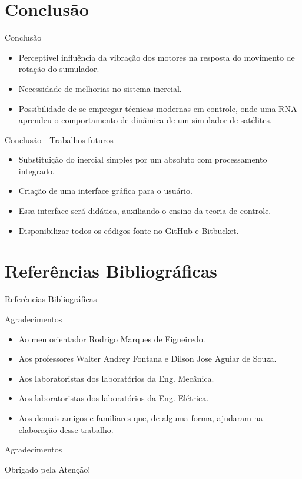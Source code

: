 \documentclass{beamer}
\begin{document}

\section{Conclusão}
	\begin{frame}{Conclusão}
    \begin{itemize}
        	\justifying
			\item Perceptível influência da vibração dos motores na resposta do movimento de rotação do sumulador.
			\item Necessidade de melhorias no sistema inercial.
			\item Possibilidade de se empregar técnicas modernas em controle, onde uma RNA aprendeu o comportamento de dinâmica de um simulador de satélites.
		\end{itemize}
\end{frame}


\begin{frame}{Conclusão - Trabalhos futuros}
    \begin{itemize}
        \justifying
		\item Substituição do inercial simples por um absoluto com processamento integrado. 
		\item Criação de uma interface gráfica para o usuário.
		\item Essa interface será didática, auxiliando o ensino da teoria de controle.  
		\item Disponibilizar todos os códigos fonte no GitHub e Bitbucket.
		\end{itemize}
\end{frame}


\section{Referências Bibliográficas}
\begin{frame}{Referências Bibliográficas}
	
\end{frame}
        

\begin{frame}{Agradecimentos}
	\begin{itemize}
        \justifying
        	\item Ao meu orientador Rodrigo Marques de Figueiredo. 
        	\item Aos professores Walter Andrey Fontana e Dilson Jose Aguiar de Souza.
			\item Aos laboratoristas dos laboratórios da Eng. Mecânica.
			\item Aos laboratoristas dos laboratórios da Eng. Elétrica.
			\item Aos demais amigos e familiares que, de alguma forma, ajudaram na elaboração desse trabalho.  
		\end{itemize}
	\end{frame}


\begin{frame}{Agradecimentos}
		\begin{center}
			{\Huge Obrigado pela Atenção!}
		\end{center}
\end{frame}
\end{document}
